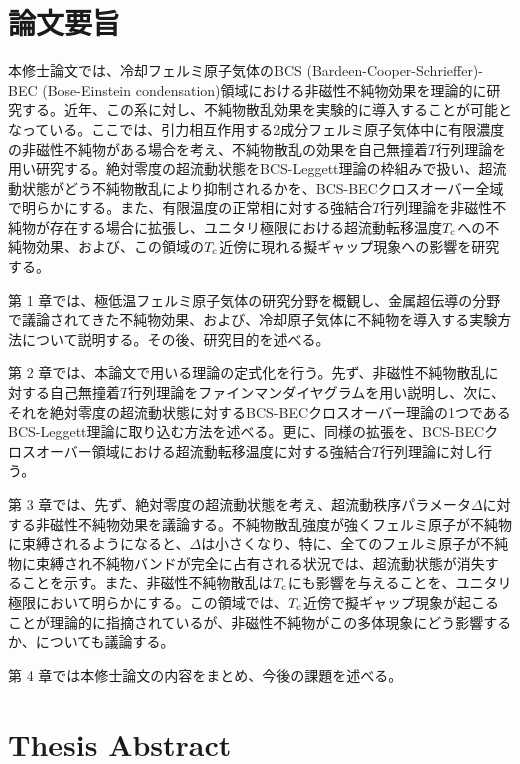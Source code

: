 \documentclass[12pt]{jsbook}
\begin{document}
\chapter*{論文要旨}
本修士論文では、冷却フェルミ原子気体のBCS (Bardeen-Cooper-Schrieffer)-BEC (Bose-Einstein condensation)領域における非磁性不純物効果を理論的に研究する。近年、この系に対し、不純物散乱効果を実験的に導入することが可能となっている。ここでは、引力相互作用する2成分フェルミ原子気体中に有限濃度の非磁性不純物がある場合を考え、不純物散乱の効果を自己無撞着$T$行列理論を用い研究する。絶対零度の超流動状態をBCS-Leggett理論の枠組みで扱い、超流動状態がどう不純物散乱により抑制されるかを、BCS-BECクロスオーバー全域で明らかにする。また、有限温度の正常相に対する強結合$T$行列理論を非磁性不純物が存在する場合に拡張し、ユニタリ極限における超流動転移温度$T_{\rm c}$への不純物効果、および、この領域の$T_{\rm c}$近傍に現れる擬ギャップ現象への影響を研究する。
\par
第 1 章では、極低温フェルミ原子気体の研究分野を概観し、金属超伝導の分野で議論されてきた不純物効果、および、冷却原子気体に不純物を導入する実験方法について説明する。その後、研究目的を述べる。
\par
第 2 章では、本論文で用いる理論の定式化を行う。先ず、非磁性不純物散乱に対する自己無撞着$T$行列理論をファインマンダイヤグラムを用い説明し、次に、それを絶対零度の超流動状態に対するBCS-BECクロスオーバー理論の1つであるBCS-Leggett理論に取り込む方法を述べる。更に、同様の拡張を、BCS-BECクロスオーバー領域における超流動転移温度に対する強結合$T$行列理論に対し行う。
\par
第 3 章では、先ず、絶対零度の超流動状態を考え、超流動秩序パラメータ$\Delta$に対する非磁性不純物効果を議論する。不純物散乱強度が強くフェルミ原子が不純物に束縛されるようになると、$\Delta$は小さくなり、特に、全てのフェルミ原子が不純物に束縛され不純物バンドが完全に占有される状況では、超流動状態が消失することを示す。また、非磁性不純物散乱は$T_{\rm c}$にも影響を与えることを、ユニタリ極限において明らかにする。この領域では、$T_{\rm c}$近傍で擬ギャップ現象が起こることが理論的に指摘されているが、非磁性不純物がこの多体現象にどう影響するか、についても議論する。
\par
第 4 章では本修士論文の内容をまとめ、今後の課題を述べる。
\par
\chapter*{Thesis Abstract}
\end{document}
